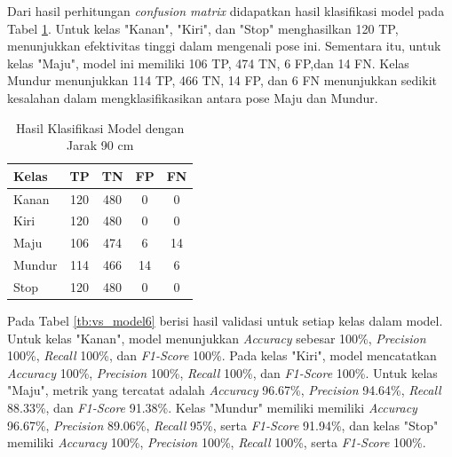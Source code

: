 Dari hasil perhitungan \emph{confusion matrix} didapatkan hasil klasifikasi model pada Tabel \ref{tb:cm_model6}. Untuk kelas "Kanan", "Kiri", dan "Stop" menghasilkan 120 TP, menunjukkan efektivitas tinggi dalam mengenali pose ini. Sementara itu, untuk kelas "Maju", model ini memiliki 106 TP, 474 TN, 6 FP,dan 14 FN. Kelas Mundur menunjukkan 114 TP, 466 TN, 14 FP, dan 6 FN menunjukkan sedikit kesalahan dalam mengklasifikasikan antara pose Maju dan Mundur.  

\begin{longtable}{|l|c|c|c|c|}
  \caption{Hasil Klasifikasi Model dengan Jarak 90 cm}
  \label{tb:cm_model6} \\
  \hline
  \rowcolor[HTML]{C0C0C0} 
  \textbf{Kelas} & \textbf{TP} & \textbf{TN} & \textbf{FP} & \textbf{FN} \\ \hline
  Kanan    & 120          & 480         & 0           & 0           \\ \hline
  Kiri      & 120          & 480         & 0           & 0           \\ \hline
  Maju      & 106          & 474         & 6           & 14           \\ \hline
  Mundur     & 114          & 466         & 14           & 6           \\ \hline
  Stop  & 120          & 480         & 0           & 0           \\ \hline
\end{longtable}

Pada Tabel \ref{tb:vs_model6} berisi hasil validasi untuk setiap kelas dalam model. Untuk kelas "Kanan", model menunjukkan \textit{Accuracy} sebesar 100\%, \textit{Precision} 100\%, \textit{Recall} 100\%, dan \textit{F1-Score} 100\%. Pada kelas "Kiri", model mencatatkan \textit{Accuracy} 100\%, \textit{Precision} 100\%, \textit{Recall} 100\%, dan \textit{F1-Score} 100\%. Untuk kelas "Maju", metrik yang tercatat adalah \textit{Accuracy} 96.67\%, \textit{Precision} 94.64\%, \textit{Recall} 88.33\%, dan \textit{F1-Score} 91.38\%. Kelas "Mundur" memiliki memiliki \textit{Accuracy} 96.67\%, \textit{Precision} 89.06\%, \textit{Recall} 95\%, serta \textit{F1-Score} 91.94\%, dan kelas "Stop" memiliki \textit{Accuracy} 100\%, \textit{Precision} 100\%, \textit{Recall} 100\%, serta \textit{F1-Score} 100\%.

